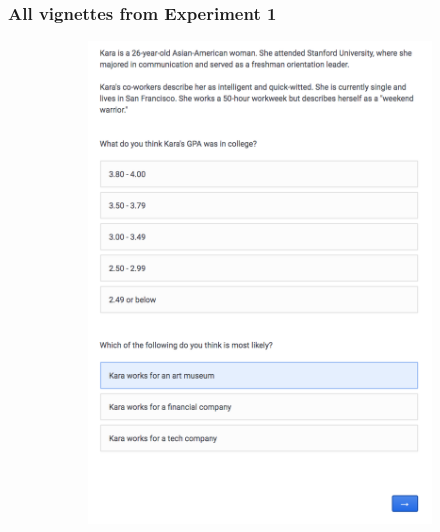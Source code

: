 \documentclass[12pt, letterpaper]{article}
\begin{document}
\subsubsection{All vignettes from Experiment 1} \label{si:study1_vigs}
\begin{figure}[h!]
\centering
\caption{To preclude suspicion, James and Linda were couched as part of a study ostensibly on people's perceptions of the returns to higher education. These are the ``Kara'' and ``Dave'' vignettes that respondents saw first.}\label{ep_figure}
\vspace{5mm}
\begin{subfigure}[t]{0.48\textwidth}
	\includegraphics[width=1\textwidth]{../figs/vig_kara.png}
	\caption{}
\end{subfigure}
\begin{subfigure}[t]{0.48\textwidth}

\end{subfigure}
\end{figure}
\end{document}
